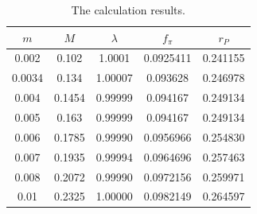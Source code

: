\documentclass{article}
\begin{document}
\begin{table}[H]
    \centering
    \begin{tabular}{|c|c|c|c|c|}
    \hline
    $m$ & $M$ & $\lambda$ & $f_\pi$ & $r_P$ \\
    \hline
    0.002 & 0.102 & 1.0001 & 0.0925411 & 0.241155 \\
    \hline
    0.0034 & 0.134 & 1.00007 & 0.093628 & 0.246978 \\
    \hline
    0.004 & 0.1454 & 0.99999 & 0.094167 & 0.249134 \\
    \hline
    0.005 & 0.163 & 0.99999 & 0.094167 & 0.249134 \\
    \hline
    0.006 & 0.1785 & 0.99990 & 0.0956966 & 0.254830 \\
    \hline
    0.007 & 0.1935 & 0.99994 & 0.0964696 & 0.257463 \\
    \hline
    0.008 & 0.2072 & 0.99990 & 0.0972156 & 0.259971 \\
    \hline
    0.01 & 0.2325 & 1.00000 & 0.0982149 & 0.264597 \\
    \hline
    \end{tabular}
    \caption{The calculation results.}
\end{table}
\end{document}
